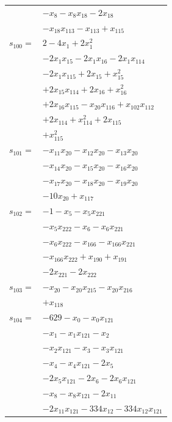 \begin{longtable}{@{}r@{\;}l@{}}
 & \(\displaystyle -x_{8} -x_{8}x_{18} -2x_{18}\) \\
 & \(\displaystyle -x_{18}x_{113} -x_{113} +x_{115}\) \\[3pt]
\(s_{100}=\) & \(\displaystyle 2 -4x_{1} +2x_{1}^{2}\) \\
 & \(\displaystyle -2x_{1}x_{15} -2x_{1}x_{16} -2x_{1}x_{114}\) \\
 & \(\displaystyle -2x_{1}x_{115} +2x_{15} +x_{15}^{2}\) \\
 & \(\displaystyle +2x_{15}x_{114} +2x_{16} +x_{16}^{2}\) \\
 & \(\displaystyle +2x_{16}x_{115} -x_{20}x_{116} +x_{102}x_{112}\) \\
 & \(\displaystyle +2x_{114} +x_{114}^{2} +2x_{115}\) \\
 & \(\displaystyle +x_{115}^{2}\) \\[3pt]
\(s_{101}=\) & \(\displaystyle -x_{11}x_{20} -x_{12}x_{20} -x_{13}x_{20}\) \\
 & \(\displaystyle -x_{14}x_{20} -x_{15}x_{20} -x_{16}x_{20}\) \\
 & \(\displaystyle -x_{17}x_{20} -x_{18}x_{20} -x_{19}x_{20}\) \\
 & \(\displaystyle -10x_{20} +x_{117}\) \\[3pt]
\(s_{102}=\) & \(\displaystyle -1 -x_{5} -x_{5}x_{221}\) \\
 & \(\displaystyle -x_{5}x_{222} -x_{6} -x_{6}x_{221}\) \\
 & \(\displaystyle -x_{6}x_{222} -x_{166} -x_{166}x_{221}\) \\
 & \(\displaystyle -x_{166}x_{222} +x_{190} +x_{191}\) \\
 & \(\displaystyle -2x_{221} -2x_{222}\) \\[3pt]
\(s_{103}=\) & \(\displaystyle -x_{20} -x_{20}x_{215} -x_{20}x_{216}\) \\
 & \(\displaystyle +x_{118}\) \\[3pt]
\(s_{104}=\) & \(\displaystyle -629 -x_{0} -x_{0}x_{121}\) \\
 & \(\displaystyle -x_{1} -x_{1}x_{121} -x_{2}\) \\
 & \(\displaystyle -x_{2}x_{121} -x_{3} -x_{3}x_{121}\) \\
 & \(\displaystyle -x_{4} -x_{4}x_{121} -2x_{5}\) \\
 & \(\displaystyle -2x_{5}x_{121} -2x_{6} -2x_{6}x_{121}\) \\
 & \(\displaystyle -x_{8} -x_{8}x_{121} -2x_{11}\) \\
 & \(\displaystyle -2x_{11}x_{121} -334x_{12} -334x_{12}x_{121}\) \\

\end{longtable}
